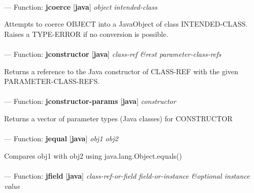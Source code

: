 \paragraph{}
\label{JAVA:JCOERCE}
--- Function: \textbf{jcoerce} [\textbf{java}] \textit{object intended-class}

\begin{adjustwidth}{5em}{5em}
Attempts to coerce OBJECT into a JavaObject of class INTENDED-CLASS.  Raises a TYPE-ERROR if no conversion is possible.
\end{adjustwidth}

\paragraph{}
\label{JAVA:JCONSTRUCTOR}
--- Function: \textbf{jconstructor} [\textbf{java}] \textit{class-ref \&rest parameter-class-refs}

\begin{adjustwidth}{5em}{5em}
Returns a reference to the Java constructor of CLASS-REF with the given PARAMETER-CLASS-REFS.
\end{adjustwidth}

\paragraph{}
\label{JAVA:JCONSTRUCTOR-PARAMS}
--- Function: \textbf{jconstructor-params} [\textbf{java}] \textit{constructor}

\begin{adjustwidth}{5em}{5em}
Returns a vector of parameter types (Java classes) for CONSTRUCTOR
\end{adjustwidth}

\paragraph{}
\label{JAVA:JEQUAL}
--- Function: \textbf{jequal} [\textbf{java}] \textit{obj1 obj2}

\begin{adjustwidth}{5em}{5em}
Compares obj1 with obj2 using java.lang.Object.equals()
\end{adjustwidth}

\paragraph{}
\label{JAVA:JFIELD}
--- Function: \textbf{jfield} [\textbf{java}] \textit{class-ref-or-field field-or-instance \&optional instance value}

